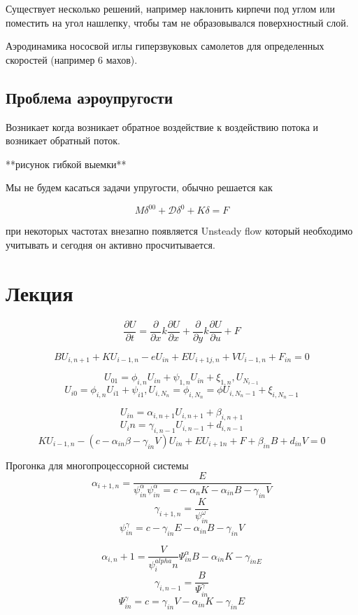 \documentclass{article}
\begin{document}
Существует несколько решений, например наклонить кирпечи под углом или поместить на угол нашлепку, чтобы там не образовывался поверхностный слой.

Аэродинамика нососвой иглы гиперзвуковых самолетов для определенных скоростей (например 6 махов).

\subsection{Проблема аэроупругости}

Возникает когда возникает обратное воздействие к воздействию потока и возникает обратный поток.

**рисунок гибкой выемки**

Мы не будем касаться задачи упругости, обычно решается как

\[ M \delta^{00} + \mathcal{D} \delta^{0} + K\delta = F \]

при некоторых частотах внезапно появляется Unsteady flow который необходимо учитывать и сегодня он активно просчитывается.

\section{Лекция}

\[ \frac{\partial U}{\partial  t} = \frac{\partial }{\partial x}k \frac{\partial U}{\partial x} + \frac{\partial }{\partial y} k \frac{\partial U}{\partial u} + F \]

\[ B U_{i, n+1} + KU_{i-1, n} - e U_{in} + EU_{i+1j, n} + V U_{i-1, n} + F_{in} = 0 \]

\[ U_{01} = \phi_{i, n} U_{in} + \psi_{1, n} U_{in} + \xi_{1, n}, U_{N_{i-1}} \]
\[ U_{i0} = \phi_{i, n} U_{i1} + \psi_{i1}, U_{i, N_n} = \phi_{i,N_n} = \phi U_{i, N_n-1} + \xi_{i,N_n-1} \]

\[ U_{in} =  \alpha_{i,n+1} U_{i, n+1} + \beta_{i, n+1} \]
\[ U_in = \gamma_{i, n-1} U_{i, n-1} + d_{i, n-1} \]
\[ KU_{i-1, n} - (c- \alpha_{in}\beta - \gamma_{in} V) U_{in} + EU_{i+1 n} + F + \beta_{in} B + d_{in} V = 0 \]

Прогонка для многопроцессорной системы
\[ \alpha_{i+1, n} = \frac{E}{\psi^
\alpha_{in} \psi^\alpha_{in} = c - \alpha_{n}K-\alpha_{in} B - \gamma_{in}V} \]
\[ \gamma_{i+1, n} =\frac{K}{\psi^\omega_{in}} \]
\[ \psi^{\gamma}_{in} = c- \gamma_{in}E - \alpha_{in}B - \gamma_{in} V \]

\[ \alpha_{i, n}+1 = \frac{V}{\psi^{alpha}_in} \Psi^{\alpha}_{in} B - \alpha_{in}K - \gamma_{in E} \]
\[ \gamma_{i, n-1} = \frac{B}{\Psi^\gamma_{in}} \]
\[ \Psi^{\gamma}_{in} = c= \gamma_{in} V - \alpha_{in} K - \gamma_{in} E \]
\end{document}
